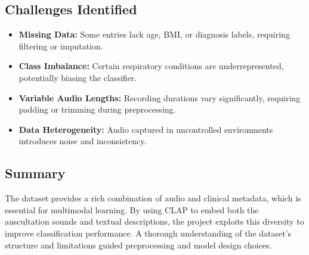 \subsection{Challenges Identified}
\begin{itemize}
    \item \textbf{Missing Data:} Some entries lack age, BMI, or diagnosis labels, requiring filtering or imputation.
    \item \textbf{Class Imbalance:} Certain respiratory conditions are underrepresented, potentially biasing the classifier.
    \item \textbf{Variable Audio Lengths:} Recording durations vary significantly, requiring padding or trimming during preprocessing.
    \item \textbf{Data Heterogeneity:} Audio captured in uncontrolled environments introduces noise and inconsistency.
\end{itemize}

\subsection*{Summary}
The dataset provides a rich combination of audio and clinical metadata, which is essential for multimodal learning. By using CLAP to embed both the auscultation sounds and textual descriptions, the project exploits this diversity to improve classification performance. A thorough understanding of the dataset’s structure and limitations guided preprocessing and model design choices.

